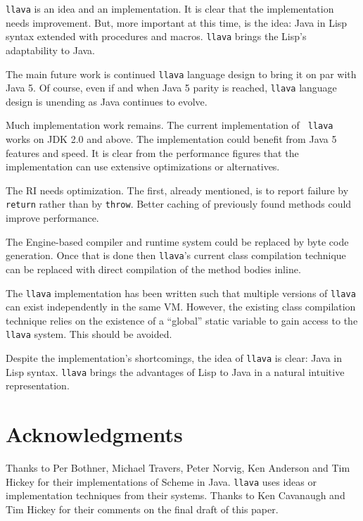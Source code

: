 \documentclass{acm-final/sig-alternate-modified}
\begin{document}
{\tt llava} is an idea and an implementation.  It is clear that the
implementation needs improvement.  But, more important at this time,
is the idea: Java in Lisp syntax extended with procedures and macros.
{\tt llava} brings the Lisp's adaptability to Java.

The main future work is continued {\tt llava} language design to bring
it on par with Java 5.  Of course, even if and when Java 5 parity is
reached, {\tt llava} language design is unending as Java continues to
evolve.

Much implementation work remains.  The current implementation of {\tt
llava} works on JDK 2.0 and above.  The implementation could benefit
from Java 5 features and speed.  It is clear from the performance
figures that the implementation can use extensive optimizations or
alternatives.

The RI needs optimization.  The first, already mentioned, is to report
failure by {\tt return} rather than by {\tt throw}.  Better caching of
previously found methods could improve performance.

The Engine-based compiler and runtime system could be replaced by byte
code generation.  Once that is done then {\tt llava}'s current class
compilation technique can be replaced with direct compilation of the
method bodies inline.  

The {\tt llava} implementation has been written such
that multiple versions of {\tt llava} can exist independently in the
same VM.  However, the existing class compilation technique relies on the
existence of a ``global'' static variable to gain access to the {\tt
llava} system.  This should be avoided.

Despite the implementation's shortcomings, the idea of {\tt llava} is
clear: Java in Lisp syntax.  {\tt llava} brings the advantages of Lisp
to Java in a natural intuitive representation.


\section{Acknowledgments}

Thanks to Per Bothner, Michael Travers, Peter Norvig, Ken Anderson and
Tim Hickey for their implementations of Scheme in Java.  {\tt llava}
uses ideas or implementation techniques from their systems.  Thanks to
Ken Cavanaugh and Tim Hickey for their comments on the final draft of
this paper.
\end{document}
